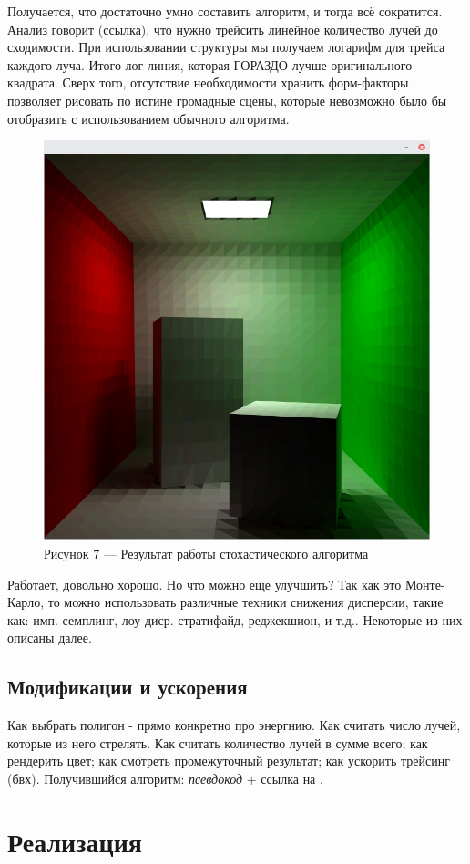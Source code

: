 \documentclass[12pt]{article}
\begin{document}
Получается, что достаточно умно составить алгоритм, и тогда всё сократится. Анализ говорит (ссылка), что нужно трейсить линейное количество лучей до сходимости. При использовании структуры мы получаем логарифм для трейса каждого луча. Итого лог-линия, которая ГОРАЗДО лучше оригинального квадрата. Сверх того, отсутствие необходимости хранить форм-факторы позволяет рисовать по истине громадные сцены, которые невозможно было бы отобразить с использованием обычного алгоритма. 
\begin{figure}[h]
\centering
\includegraphics[scale=0.3]{rad_stoch.png}
\caption*{Рисунок 7 --- Результат работы стохастического алгоритма}
\end{figure}

Работает, довольно хорошо. Но что можно еще улучшить? Так как это Монте-Карло, то можно использовать различные техники снижения дисперсии, такие как: имп. семплинг, лоу диср. стратифайд, реджекшион, и т.д.. Некоторые из них описаны далее.
\subsection{Модификации и ускорения}
Как выбрать полигон - прямо конкретно про энергнию. Как считать число лучей, которые из него стрелять. Как считать количество лучей в сумме всего; как рендерить цвет; как смотреть промежуточный результат; как ускорить трейсинг (бвх). Получившийся алгоритм: \emph{псевдокод} + ссылка на \cite{Pet06}.
\newpage\section{Реализация}
\end{document}
